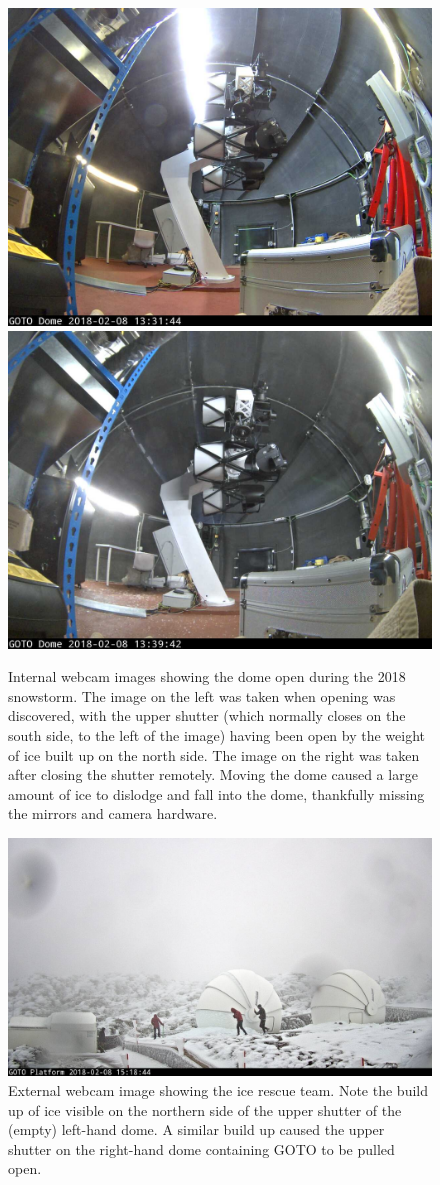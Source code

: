 \begin{colsection}
\begin{figure}[p]
    \begin{center}
        \includegraphics[width=0.45\linewidth]{images/ice_open.jpeg}
        \includegraphics[width=0.45\linewidth]{images/ice_closed.jpeg}
    \end{center}
    \caption[Internal webcam images showing the dome open during a snowstorm]{
        Internal webcam images showing the dome open during the 2018 snowstorm. The image on the left was taken when opening was discovered, with the upper shutter (which normally closes on the south side, to the left of the image) having been open by the weight of ice built up on the north side. The image on the right was taken after closing the shutter remotely. Moving the dome caused a large amount of ice to dislodge and fall into the dome, thankfully missing the mirrors and camera hardware.
    }\label{fig:ice_internal}
\end{figure}

\begin{figure}[p]
    \begin{center}
    \includegraphics[width=0.88\linewidth]{images/ice_outside.jpeg}
    \end{center}
    \caption[External webcam image showing the ice rescue team]{
        External webcam image showing the ice rescue team. Note the build up of ice visible on the northern side of the upper shutter of the (empty) left-hand dome. A similar build up caused the upper shutter on the right-hand dome containing GOTO to be pulled open.
    }\label{fig:ice_external}
\end{figure}


\end{colsection}
